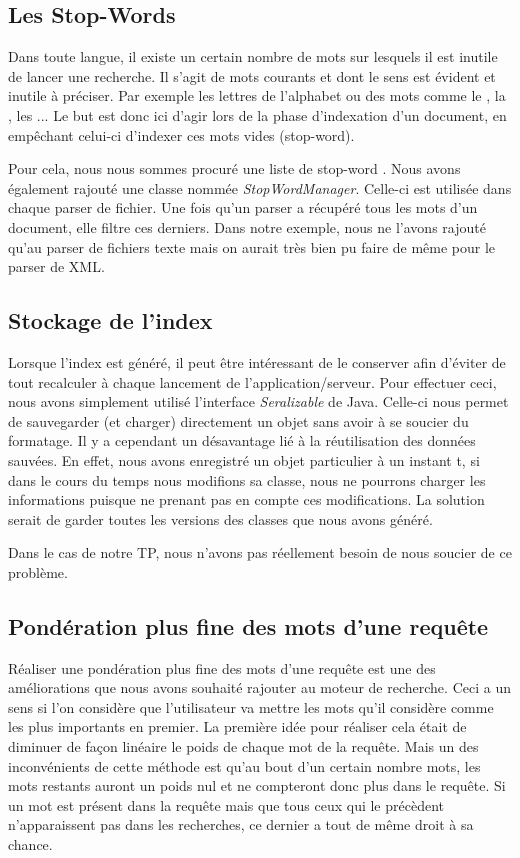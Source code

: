 \documentclass[a4paper,12pt]{article}
\begin{document}
\subsection{Les Stop-Words}

Dans toute langue, il existe un certain nombre de \og mots \fg{} sur lesquels il est inutile de lancer une recherche. Il s'agit de mots courants et dont le sens est évident et inutile à préciser. Par exemple les lettres de l'alphabet ou des mots comme \og le \fg{}, \og la \fg{}, \og les \fg{} ... Le but est donc ici d'agir lors de la phase d'indexation d'un document, en empêchant celui-ci d'indexer ces \og mots vides \fg{} (stop-word).

Pour cela, nous nous sommes procuré une liste de \og stop-word \fg{}. Nous avons également rajouté une classe nommée \textit{StopWordManager}. Celle-ci est utilisée dans chaque parser de fichier. Une fois qu'un parser a récupéré tous les mots d'un document, elle filtre ces derniers. Dans notre exemple, nous ne l'avons rajouté qu'au parser de fichiers texte mais on aurait très bien pu faire de même pour le parser de XML.

\subsection{Stockage de l'index}

Lorsque l'index est généré, il peut être intéressant de le conserver afin d'éviter de tout recalculer à chaque lancement de l'application/serveur. Pour effectuer ceci, nous avons simplement utilisé l'interface \textit{Seralizable} de Java. Celle-ci nous permet de sauvegarder (et charger) directement un objet sans avoir à se soucier du formatage. Il y a cependant un désavantage lié à la réutilisation des données sauvées. En effet, nous avons enregistré un objet particulier à un instant t, si dans le cours du temps nous modifions sa classe, nous ne pourrons charger les informations puisque ne prenant pas en compte ces modifications. La solution serait de garder toutes les versions des classes que nous avons généré.

Dans le cas de notre TP, nous n'avons pas réellement besoin de nous soucier de ce problème.

\subsection{Pondération plus fine des mots d'une requête}

Réaliser une pondération plus fine des mots d'une requête est une des améliorations que nous avons souhaité rajouter au moteur de recherche. Ceci a un sens si l'on
considère que l'utilisateur va mettre les mots qu'il considère comme les plus importants en premier. La première idée pour réaliser cela était de diminuer de façon linéaire le poids de chaque mot de la requête.
Mais un des inconvénients de cette méthode est qu'au bout d'un certain nombre mots, les mots restants auront un poids nul et ne compteront donc plus dans le requête. Si un mot est présent dans la requête mais que tous ceux qui le précèdent n'apparaissent pas dans les recherches, ce dernier a tout de même droit à sa chance.
\end{document}
